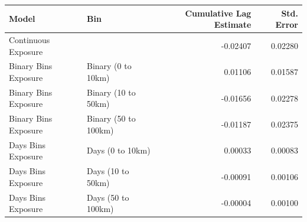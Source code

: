 \begin{table}[ht]
\centering
\begin{tabular}{llrr}
  \toprule
Model & Bin & Cumulative Lag Estimate & Std. Error \\ 
  \midrule
Continuous Exposure &  & -0.02407 & 0.02280 \\ 
  Binary Bins Exposure & Binary (0 to 10km) & 0.01106 & 0.01587 \\ 
  Binary Bins Exposure & Binary (10 to 50km) & -0.01656 & 0.02278 \\ 
  Binary Bins Exposure & Binary (50 to 100km) & -0.01187 & 0.02375 \\ 
  Days Bins Exposure & Days (0 to 10km) & 0.00033 & 0.00083 \\ 
  Days Bins Exposure & Days (10 to 50km) & -0.00091 & 0.00106 \\ 
  Days Bins Exposure & Days (50 to 100km) & -0.00004 & 0.00100 \\ 
   \bottomrule
\end{tabular}
\end{table}
